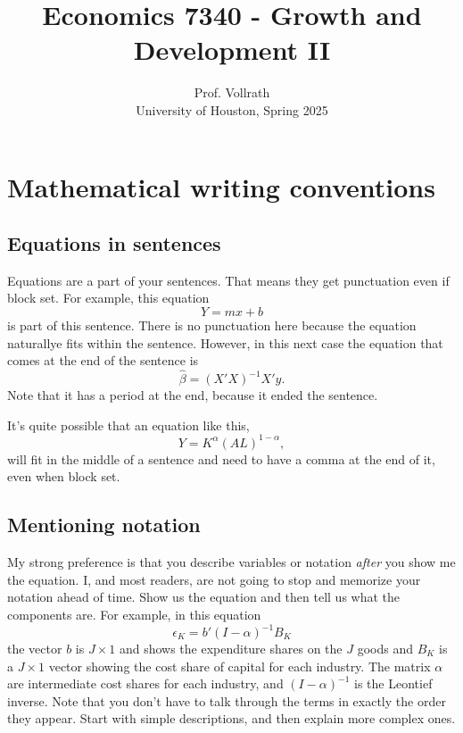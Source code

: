 \documentclass{article}
\begin{document}
\onehalfspacing

\title{Economics 7340 - Growth and Development II}
\author{Prof. Vollrath\\
University of Houston, Spring 2025} \maketitle

\section*{Mathematical writing conventions}

\subsection*{Equations in sentences}
Equations are a part of your sentences. That means they get punctuation even if block set. For example, this equation
\begin{equation}
    Y = mx + b \label{EQ_slope}
\end{equation}
is part of this sentence. There is no punctuation here because the equation naturallye fits within the sentence. However, in this next case the equation that comes at the end of the sentence is
\begin{equation}
    \hat{\beta} = (X'X)^{-1}X'y. \nonumber
\end{equation}
Note that it has a period at the end, because it ended the sentence.

It's quite possible that an equation like this, 
\begin{equation}
    Y = K^{\alpha}(AL)^{1-\alpha}, \nonumber
\end{equation}
will fit in the middle of a sentence and need to have a comma at the end of it, even when block set. 

\subsection*{Mentioning notation}
My strong preference is that you describe variables or notation \textit{after} you show me the equation. I, and most readers, are not going to stop and memorize your notation ahead of time. Show us the equation and then tell us what the components are. For example, in this equation
\begin{equation*}
    \epsilon_K = b'(I-\alpha)^{-1} B_K
\end{equation*}
the vector $b$ is $J\times1$ and shows the expenditure shares on the $J$ goods and $B_K$ is a $J\times1$ vector showing the cost share of capital for each industry. The matrix $\alpha$ are intermediate cost shares for each industry, and $(I-\alpha)^{-1}$ is the Leontief inverse. Note that you don't have to talk through the terms in exactly the order they appear. Start with simple descriptions, and then explain more complex ones. 
\end{document}
